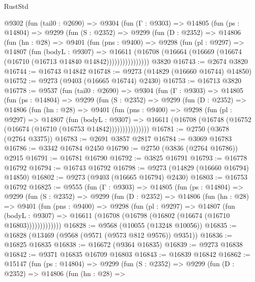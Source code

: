 \begin{lexlean}{RustStd}
\begin{coremodule}
{\begin{coremodule}
{{{{{{{{{{{{{{{{{{{{{{{{{{{{{{{{{{{{{{{{{{{{{{{{{{{{{{{    @9302
      (fun (tail0 : @2690) =>
      @9304
        (fun (Γ : @9303) =>
        @14805
          (fun (ps : @14804) =>
          @9299
            (fun (S : @2352) =>
            @9299
              (fun (D : @2352) =>
              @14806
                (fun (hn : @28) =>
                @9401
                  (fun (pns : @9400) =>
                  @9298
                    (fun (pl : @9297) =>
                    @14807
                      (fun (bodyL : @9307) =>
                      @16611
                        (@16708
                          (@16664 (@16669 (@16674 (@16710 (@16713 @14840 @14842))))))))))))))))
    @3820
@16743 := @2674 @3820
@16744 := @16743 @14842
@16748 := @9273 (@14829 (@16660 @16744) @14850)
@16752 := @9273 (@9403 (@16665 @16744) @2430)
@16753 := @16713 @3820
@16778 := @9537
    (fun (tail0 : @2690) =>
    @9304
      (fun (Γ : @9303) =>
      @14805
        (fun (ps : @14804) =>
        @9299
          (fun (S : @2352) =>
          @9299
            (fun (D : @2352) =>
            @14806
              (fun (hn : @28) =>
              @9401
                (fun (pns : @9400) =>
                @9298
                  (fun (pl : @9297) =>
                  @14807
                    (fun (bodyL : @9307) =>
                    @16611 (@16708 (@16748 (@16752 (@16674 (@16710 (@16753 @14842)))))))))))))))
@16781 := @2750 (@3678 (@2764 @3375))
@16783 := @2691 @3857 @2817
@16784 := @3069 @16783
@16786 := @3342 @16784 @2450
@16790 := @2750 (@3836 (@2764 @16786)) @2915
@16791 := @16781 @16790
@16792 := @3825 @16791
@16793 := @16778 @16792
@16794 := @16743 @16792
@16798 := @9273 (@14829 (@16660 @16794) @14850)
@16802 := @9273 (@9403 (@16665 @16794) @2430)
@16803 := @16753 @16792
@16825 := @9555
    (fun (Γ : @9303) =>
    @14805
      (fun (ps : @14804) =>
      @9299
        (fun (S : @2352) =>
        @9299
          (fun (D : @2352) =>
          @14806
            (fun (hn : @28) =>
            @9401
              (fun (pns : @9400) =>
              @9298
                (fun (pl : @9297) =>
                @14807
                  (fun (bodyL : @9307) =>
                  @16611 (@16708 (@16798 (@16802 (@16674 (@16710 @16803)))))))))))))
@16828 := @9568 (@10055 (@13248 @10056))
@16835 := @16828 (@13469 (@9568 (@9571 (@9573 @812 @9576)) @9351))
@16836 := @16825 @16835
@16838 := @16672 (@9364 @16835)
@16839 := @9273 @16838
@16842 := @9371 @16835 @16709 @16803
@16843 := @16839 @16842
@16862 := @15147
    (fun (ps : @14804) =>
    @9299
      (fun (S : @2352) =>
      @9299
        (fun (D : @2352) =>
        @14806
          (fun (hn : @28) =>
}}}}}}}}}}}}}}}}}}}}}}}}}}}}}}}}}}}}}}}}}}}}}}}}}}}}}}}
\end{coremodule}}
\end{coremodule}
\end{lexlean}
